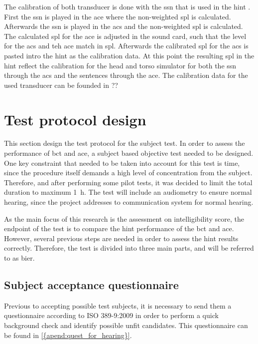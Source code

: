 The calibration of both transducer is done with the \gls{ssn} that is used in the \gls{hint} \citep{nilsson_95}. First the \gls{ssn} is played in the \gls{ace} where the non-weighted \gls{spl} is calculated. Afterwards the \gls{ssn} is played in the \gls{acs} and the non-weighted \gls{spl} is calculated. The calculated \gls{spl} for the \gls{ace} is adjusted in the sound card, such that the level for the \gls{acs} and teh \gls{ace} match in \gls{spl}. Afterwards the calibrated \gls{spl} for the \gls{acs} is pasted intro the \gls{hint} as the calibration data. At this point the resulting \gls{spl}  in the \gls{hint} reflect the calibration for the head and torso simulator for both the \gls{ssn} through the \gls{acs} and the sentences through the \gls{ace}. The calibration data for the used transducer can be founded in ?? %
   
   
   
\section{Test protocol design}
\label{sec:test_protocol_design}   
This section design the test protocol for the subject test. In order to assess the performance of \gls{bct} and \gls{ace}, a subject based objective test needed to be designed. One key constraint that needed to be taken into account for this test is time, since the procedure itself demands a high level of concentration from the subject. Therefore, and after performing some pilot tests, it was decided to limit the total duration to maximum \SI{1}{\hour}. The test will include an audiometry to ensure normal hearing, since the project addresses to communication system for normal hearing.
 
As the main focus of this research is the assessment on intelligibility score, the endpoint of the test is to compare the \gls{hint} performance of the \gls{bct} and \gls{ace}. However, several previous steps are needed in order to assess the \gls{hint} results correctly. Therefore, the test is divided into three main parts, and will be referred to as \gls{bier}. 
 
 
 
 \subsection{Subject acceptance questionnaire}
Previous to accepting possible test subjects, it is necessary to send them a questionnaire according to ISO 389-9:2009 \citep{iso_389-9} in order to perform a quick background check and identify possible unfit candidates. This questionnaire can be found in \autoref{{apend:quest_for_hearing}}.
  
